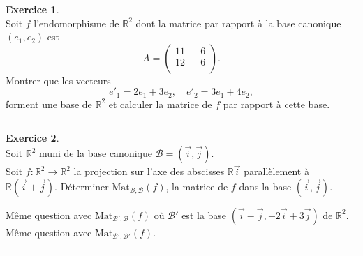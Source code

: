 \documentclass[a4paper,10pt]{article}
\theoremstyle{definition}
\theoremstyle{definition}
\newtheorem{exo}{Exercice}
\newcommand{\R}{\mathbb{R}}
\begin{document}
\begin{minipage}{1\linewidth}
	\begin{minipage}[t]{0.48\linewidth}
		\raggedright
		
		
		
		\begin{exo}\quad\\
		Soit $f$ l'endomorphisme de $\R^2$ dont la matrice par
		rapport \`a la base canonique $(e_1, e_2)$ est
		$$A= \left( 
		\begin{array}{cc}
		11 & -6  \\
		12 & -6  \\
		\end{array}
		\right).$$
		Montrer que les vecteurs
		$$ e'_1 = 2e_1+3e_2,\quad e'_2 = 3e_1+4e_2,$$
		forment une base de $\R^2$ et calculer la matrice de $f$ par
		rapport \`a cette base.	
		
			\centering
			\rule{1\linewidth}{0.6pt}
		\end{exo}
		

		
		\begin{exo}\quad\\
		Soit $\R^2$ muni de la base canonique $\mathcal{B}=(\vec{i}, \vec{j})$.\\
		Soit $f : \R^2 \to \R^2$ la projection sur l'axe des abscisses $\R \vec{i}$ 
		parall\`element à $\R (\vec{i} + \vec{j})$.
		Déterminer $\textrm{Mat}_{\mathcal{B},\mathcal{B}}(f)$, la matrice de $f$ dans la base $(\vec{i}, \vec{j})$.
		
		Même question avec $\textrm{Mat}_{\mathcal{B}',\mathcal{B}}(f)$ où $\mathcal{B'}$ est la base 
		$(\vec{i} - \vec{j}, -2\vec{i}+3\vec{j})$ de $\R^2$.
		Même question avec $\textrm{Mat}_{\mathcal{B}',\mathcal{B}'}(f)$.	
			
			\centering
			\rule{1\linewidth}{0.6pt}
		\end{exo}
		
		
	\end{minipage}	
	\hfill\vrule\hfill
	\begin{minipage}[t]{0.48\linewidth}
		\raggedright
		

\end{minipage}
\end{minipage}
\end{document}
